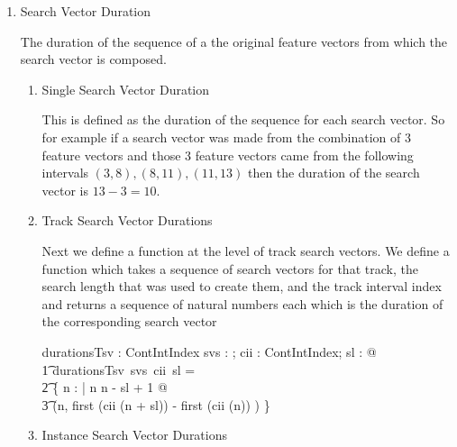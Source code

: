 \documentclass[11pt]{article}
\begin{document}
\begin{enumerate}
For each Search Vector in an instances search vectors we take the associated unit values and take the arithmetic mean. 

\begin{axdef}
	average : \V \fun \R
\end{axdef}

\begin{schema}{Powers}
	SearchVectors \\
	powers : \seq (\seq \R) 
\where 
	powers = map~(map ~ average) ~  unitvs! \\
\end{schema}

\item \textsf{Search Vector Duration}

The duration of the sequence of a the original feature vectors from which the search vector is composed. 

\begin{enumerate}

\item \textsf{Single Search Vector Duration}

This is defined as the duration of the sequence for each search vector. So for example if a search vector was made from the combination of 3 feature vectors and those 3 feature vectors came from the following intervals $ (3,8), (8,11), (11,13) $ then the duration of the search vector is $13-3=10$. 

\item \textsf{Track Search Vector Durations}

Next we define a function at the level of track search vectors. We define a function which takes a sequence of search vectors for that track, the search length that was used to create them, and the track interval index and returns a sequence of natural numbers each which is the duration of the corresponding search vector

\begin{axdef}
	durationsTsv : \seq \Vdsl  \fun  ContIntIndex \fun \nat \fun  \seq \R
\where
	\forall svs : \seq \Vdsl;  cii :  ContIntIndex; sl : \nat @ \\
	\t1 durationsTsv~svs~cii~sl = \\
	\t2 \{ n : \nat | n  \upto n - sl + 1 @ \\
	\t3 (n,  first (cii (n + sl)) - first (cii (n)) ) \} 
\end{axdef}

\item \textsf{Instance Search Vector Durations}


\end{enumerate}
\end{enumerate}
\end{document}

